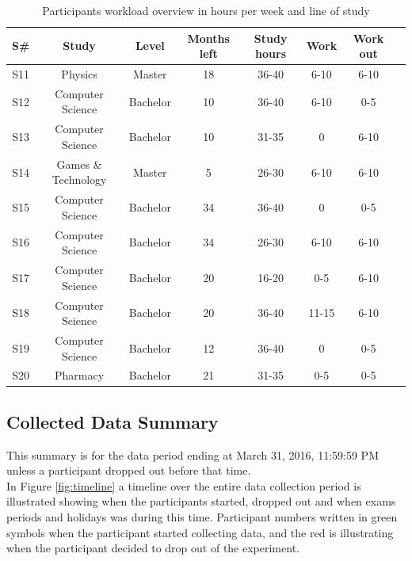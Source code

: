 \documentclass[12pt]{article} %
\begin{document}
\begin{table}[H]
\center
\begin{footnotesize}
	\begin{tabular}{| c | c | c | c | c | c | c | c |}
	\hline
	\textbf{S\#} & \textbf{Study} & \textbf{Level} & \textbf{Months left} & \textbf{Study hours} & \textbf{Work} & \textbf{Work out}\\
	\hline
	S11 & Physics & Master & 18 & 36-40 & 6-10 & 6-10 \\
	\hline
	S12 & Computer Science & Bachelor & 10 & 36-40 & 6-10 & 0-5\\
	\hline
	S13 & Computer Science & Bachelor & 10 & 31-35 & 0 & 6-10\\
	\hline
	S14 & Games \& Technology & Master & 5 & 26-30 & 6-10 & 6-10\\
	\hline
	S15 & Computer Science & Bachelor & 34 & 36-40 & 0 & 0-5\\
	\hline
	S16 & Computer Science & Bachelor & 34 & 26-30 & 6-10 & 6-10\\
	\hline
	S17 & Computer Science & Bachelor & 20 & 16-20 & 0-5 & 6-10\\
	\hline
	S18 & Computer Science & Bachelor & 20 & 36-40 & 11-15 & 6-10\\
	\hline
	S19 & Computer Science & Bachelor & 12 & 36-40 & 0 & 0-5\\
	\hline
	S20 & Pharmacy & Bachelor & 21 & 31-35 & 0-5 & 0-5\\
	\hline
	\end{tabular}
	\caption{Participants workload overview in hours per week and line of study}
	\label{tab:part1v}
\end{footnotesize}
\end{table}


\subsection{Collected Data Summary}
This summary is for the data period ending at March 31, 2016, 11:59:59 PM unless a participant dropped out before that time. \\

In Figure \ref{fig:timeline} a timeline over the entire data collection period is illustrated showing when the participants started, dropped out and when exams periods and holidays was during this time. Participant numbers written in green symbols when the participant started collecting data, and the red is illustrating when the participant decided to drop out of the experiment. 
\end{document}
